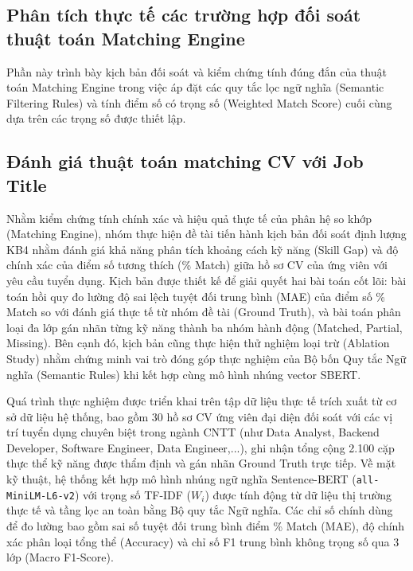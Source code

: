 \subsection{Phân tích thực tế các trường hợp đối soát thuật toán Matching Engine}
\label{subsec:matching_evaluation}

Phần này trình bày kịch bản đối soát và kiểm chứng tính đúng đắn của thuật toán Matching Engine trong việc áp đặt các quy tắc lọc ngữ nghĩa (Semantic Filtering Rules) và tính điểm số có trọng số (Weighted Match Score) cuối cùng dựa trên các trọng số được thiết lập.

\subsection{Đánh giá thuật toán matching CV với Job Title}
\label{subsubsec:test_scenario_4}

Nhằm kiểm chứng tính chính xác và hiệu quả thực tế của phân hệ so khớp (Matching Engine), nhóm thực hiện đề tài tiến hành kịch bản đối soát định lượng KB4 nhằm đánh giá khả năng phân tích khoảng cách kỹ năng (Skill Gap) và độ chính xác của điểm số tương thích (\% Match) giữa hồ sơ CV của ứng viên với yêu cầu tuyển dụng. Kịch bản được thiết kế để giải quyết hai bài toán cốt lõi: bài toán hồi quy đo lường độ sai lệch tuyệt đối trung bình (MAE) của điểm số \% Match so với đánh giá thực tế từ nhóm đề tài (Ground Truth), và bài toán phân loại đa lớp gán nhãn từng kỹ năng thành ba nhóm hành động (Matched, Partial, Missing). Bên cạnh đó, kịch bản cũng thực hiện thử nghiệm loại trừ (Ablation Study) nhằm chứng minh vai trò đóng góp thực nghiệm của Bộ bốn Quy tắc Ngữ nghĩa (Semantic Rules) khi kết hợp cùng mô hình nhúng vector SBERT.

Quá trình thực nghiệm được triển khai trên tập dữ liệu thực tế trích xuất từ cơ sở dữ liệu hệ thống, bao gồm 30 hồ sơ CV ứng viên đại diện đối soát với các vị trí tuyển dụng chuyên biệt trong ngành CNTT (như Data Analyst, Backend Developer, Software Engineer, Data Engineer,...), ghi nhận tổng cộng 2.100 cặp thực thể kỹ năng được thẩm định và gán nhãn Ground Truth trực tiếp. Về mặt kỹ thuật, hệ thống kết hợp mô hình nhúng ngữ nghĩa Sentence-BERT (\texttt{all-MiniLM-L6-v2}) với trọng số TF-IDF ($W_i$) được tính động từ dữ liệu thị trường thực tế và tầng lọc an toàn bằng Bộ quy tắc Ngữ nghĩa. Các chỉ số chính dùng để đo lường bao gồm sai số tuyệt đối trung bình điểm \% Match (MAE), độ chính xác phân loại tổng thể (Accuracy) và chỉ số F1 trung bình không trọng số qua 3 lớp (Macro F1-Score).

